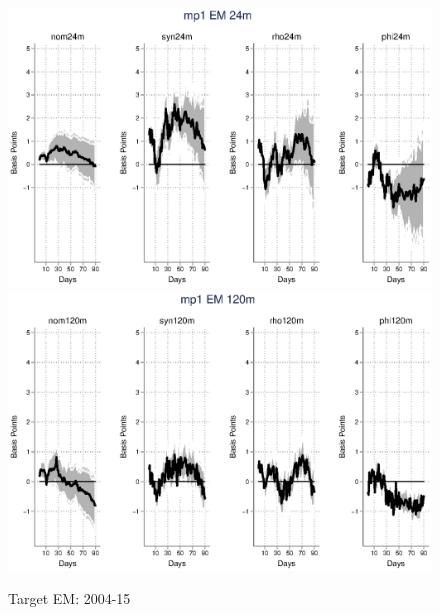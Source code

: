 \documentclass{article}
\begin{document}
\pagebreak[4]

\begin{figure}[tbph]
	\begin{center}
		\caption{Target EM: 2004-15}
		\includegraphics[trim={0cm 0cm 0cm 0cm},clip,height=0.5\textheight,width=1\textwidth]{../LagDep-FX/Target/EM/TargetEM24m.eps} \\
		\includegraphics[trim={0cm 0cm 0cm 0cm},clip,height=0.5\textheight,width=1\textwidth]{../LagDep-FX/Target/EM/TargetEM120m.eps} \\
	\end{center}
\end{figure}

\pagebreak[4]
\end{document}
